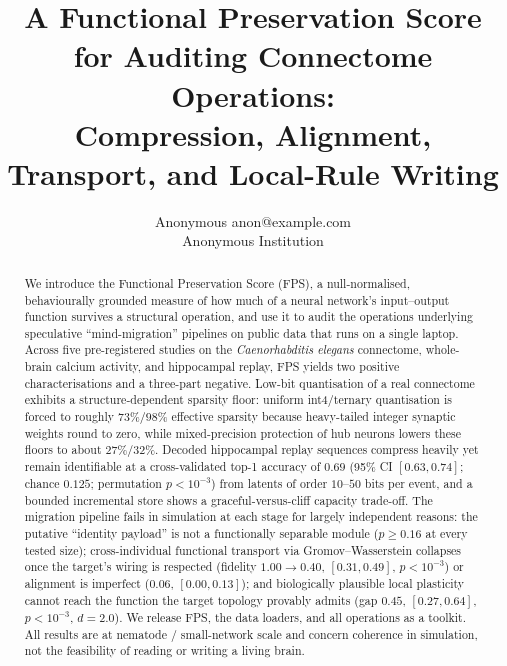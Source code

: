 \documentclass[10pt]{article}
\title{A Functional Preservation Score for Auditing Connectome Operations:\\
Compression, Alignment, Transport, and Local-Rule Writing}
\author{\name Anonymous \email anon@example.com \\
  \addr Anonymous Institution}
\begin{document}
\maketitle

\begin{abstract}
We introduce the Functional Preservation Score (FPS), a null-normalised, behaviourally grounded
measure of how much of a neural network's input--output function survives a structural operation,
and use it to audit the operations underlying speculative ``mind-migration'' pipelines on public
data that runs on a single laptop. Across five pre-registered studies on the \emph{Caenorhabditis
elegans} connectome, whole-brain calcium activity, and hippocampal replay, FPS yields two positive
characterisations and a three-part negative. Low-bit quantisation of a real connectome exhibits a
structure-dependent sparsity floor: uniform int4/ternary quantisation is forced to roughly
$73\%/98\%$ effective sparsity because heavy-tailed integer synaptic weights round to zero, while
mixed-precision protection of hub neurons lowers these floors to about $27\%/32\%$. Decoded
hippocampal replay sequences compress heavily yet remain identifiable at a cross-validated top-1
accuracy of $0.69$ (95\% CI $[0.63,0.74]$; chance $0.125$; permutation $p<10^{-3}$) from latents of
order $10$--$50$ bits per event, and a bounded incremental store shows a graceful-versus-cliff
capacity trade-off. The migration pipeline fails in simulation at each stage for largely
independent reasons: the putative ``identity payload'' is not a functionally separable module
($p\geq0.16$ at every tested size); cross-individual functional transport via Gromov--Wasserstein
collapses once the target's wiring is respected (fidelity $1.00\!\to\!0.40$, $[0.31,0.49]$,
$p<10^{-3}$) or alignment is imperfect ($0.06$, $[0.00,0.13]$); and biologically plausible local
plasticity cannot reach the function the target topology provably admits (gap $0.45$,
$[0.27,0.64]$, $p<10^{-3}$, $d=2.0$). We release FPS, the data loaders, and all operations as a
toolkit. All results are at nematode / small-network scale and concern coherence in simulation,
not the feasibility of reading or writing a living brain.
\end{abstract}
\end{document}
